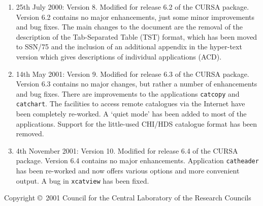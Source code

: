 \documentclass[twoside,11pt]{article}
\newcommand{\stardoccopyright} 
{Copyright \copyright\ 2001 Council for the Central Laboratory of the Research Councils}
\newcommand{\htmladdnormallink}[2]{#1}
\newcommand{\xref}[3]{#1}
\renewcommand{\_}{\texttt{\symbol{95}}}
\begin{document}
\begin{enumerate}
  \item 25th July 2000: Version 8.
   Modified for \htmladdnormallink{release 6.2}
   {http://www.roe.ac.uk/acdwww/cursa/news/v6_2.lis} of the CURSA package.
   Version 6.2 contains no major enhancements, just some minor improvements
   and bug fixes.  The main changes to the document are the removal of the
   description of the Tab-Separated Table (TST) format, which has been
   moved to \xref{SSN/75}{ssn75}{} and the inclusion of an additional
   appendix in the hyper-text version which gives descriptions of individual
   applications (ACD).

  \item 14th May 2001: Version 9.
   Modified for \htmladdnormallink{release 6.3}
   {http://www.roe.ac.uk/acdwww/cursa/news/v6_3.lis} of the CURSA package.
   Version 6.3 contains no major changes, but rather a number of
   enhancements and bug fixes.  There are improvements to the applications
   {\tt catcopy} and {\tt catchart}.  The facilities to access remote
   catalogues via the Internet have been completely re-worked.  A `quiet
   mode' has been added to most of the applications.  Support for the
   little-used CHI/HDS catalogue format has been removed.

  \item 4th November 2001: Version 10.
   Modified for \htmladdnormallink{release 6.4}
   {http://www.roe.ac.uk/acdwww/cursa/news/v6_4.lis} of the CURSA package.
   Version 6.4 contains no major enhancements.  Application {\tt catheader}
   has been re-worked and now offers various options and more convenient
   output.  A bug in {\tt xcatview} has been fixed.

\end{enumerate}

\vspace*{\fill}
\stardoccopyright
\end{document}
